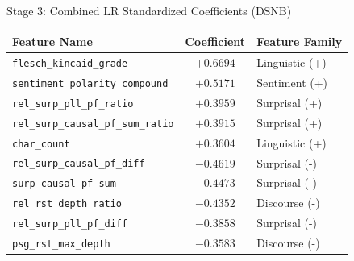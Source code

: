 \documentclass[aspectratio=169]{beamer}
\begin{document}
\begin{frame}{Stage 3: Combined LR Standardized Coefficients (DSNB)}
    \begin{table}
        \centering
        \small
        \begin{tabular}{lcl}
            \toprule
            \textbf{Feature Name} & \textbf{Coefficient} & \textbf{Feature Family} \\
            \midrule
            \texttt{flesch\_kincaid\_grade} & $+0.6694$ & Linguistic (+) \\
            \texttt{sentiment\_polarity\_compound} & $+0.5171$ & Sentiment (+) \\
            \texttt{rel\_surp\_pll\_pf\_ratio} & $+0.3959$ & Surprisal (+) \\
            \texttt{rel\_surp\_causal\_pf\_sum\_ratio} & $+0.3915$ & Surprisal (+) \\
            \texttt{char\_count} & $+0.3604$ & Linguistic (+) \\
            \midrule
            \texttt{rel\_surp\_causal\_pf\_diff} & $-0.4619$ & Surprisal (-) \\
            \texttt{surp\_causal\_pf\_sum} & $-0.4473$ & Surprisal (-) \\
            \texttt{rel\_rst\_depth\_ratio} & $-0.4352$ & Discourse (-) \\
            \texttt{rel\_surp\_pll\_pf\_diff} & $-0.3858$ & Surprisal (-) \\
            \texttt{psg\_rst\_max\_depth} & $-0.3583$ & Discourse (-) \\
            \bottomrule
        \end{tabular}
    \end{table}
\end{frame}
\end{document}

